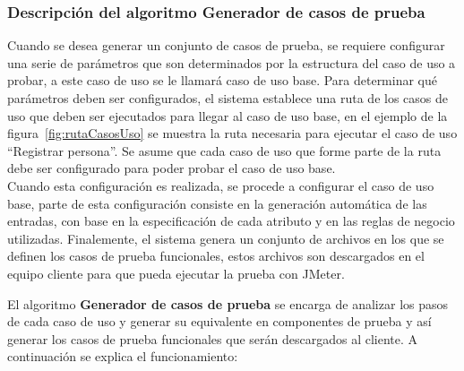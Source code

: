 	\newpage

	\subsubsection{Descripción del algoritmo Generador de casos de prueba}
	
	Cuando se desea generar un conjunto de casos de prueba, se requiere configurar una serie de parámetros que son determinados por la estructura del caso de uso a probar, a este caso de uso se le llamará caso de uso base. Para determinar qué parámetros deben ser configurados, el sistema establece una ruta de los casos de uso que deben ser ejecutados para llegar al caso de uso base, en el ejemplo de la figura~\ref{fig:rutaCasosUso} se muestra la ruta necesaria para ejecutar el caso de uso ``Registrar persona''. Se asume que cada caso de uso que forme parte de la ruta debe ser configurado para poder probar el caso de uso base. \\
	
	Cuando esta configuración es realizada, se procede a configurar el caso de uso base, parte de esta configuración consiste en la generación automática de las entradas, con base en la especificación de cada atributo y en las reglas de negocio utilizadas. Finalemente, el sistema genera un conjunto de archivos en los que se definen los casos de prueba funcionales, estos archivos son descargados en el equipo cliente para que pueda ejecutar la prueba con JMeter.
	
	
	
	El algoritmo {\bf Generador de casos de prueba} se encarga de analizar los pasos de cada caso de uso y generar su equivalente en  componentes de prueba y así generar los casos de prueba funcionales que serán descargados al cliente. A continuación se explica el funcionamiento:\\
		
